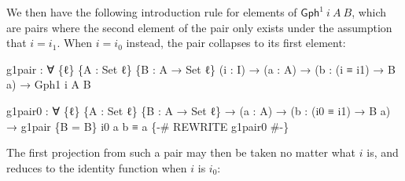 \documentclass[
  12pt]{article}
\newenvironment{Shaded}{\begin{snugshade}}{\end{snugshade}}
\newcommand{\DataTypeTok}[1]{\textcolor[rgb]{0.00,0.34,0.68}{#1}}
\newcommand{\NormalTok}[1]{\textcolor[rgb]{0.12,0.11,0.11}{#1}}
\newcommand{\OtherTok}[1]{\textcolor[rgb]{0.00,0.43,0.16}{#1}}
\newcommand{\PreprocessorTok}[1]{\textcolor[rgb]{0.00,0.43,0.16}{#1}}
\begin{document}
We then have the following introduction rule for elements of
\(\mathsf{Gph}^1 ~ i ~ A ~ B\), which are pairs where the second element
of the pair only exists under the assumption that \(i = i_1\). When
\(i = i_0\) instead, the pair collapses to its first element:

\begin{Shaded}
\begin{Highlighting}[]
\NormalTok{    g1pair }\OtherTok{:} \OtherTok{∀} \OtherTok{\{}\NormalTok{ℓ}\OtherTok{\}} \OtherTok{\{}\NormalTok{A }\OtherTok{:} \DataTypeTok{Set}\NormalTok{ ℓ}\OtherTok{\}} \OtherTok{\{}\NormalTok{B }\OtherTok{:}\NormalTok{ A }\OtherTok{→} \DataTypeTok{Set}\NormalTok{ ℓ}\OtherTok{\}} \OtherTok{(}\NormalTok{i }\OtherTok{:}\NormalTok{ I}\OtherTok{)}
             \OtherTok{→} \OtherTok{(}\NormalTok{a }\OtherTok{:}\NormalTok{ A}\OtherTok{)} \OtherTok{→} \OtherTok{(}\NormalTok{b }\OtherTok{:} \OtherTok{(}\NormalTok{i ≡ i1}\OtherTok{)} \OtherTok{→}\NormalTok{ B a}\OtherTok{)} \OtherTok{→}\NormalTok{ Gph1 i A B}

\NormalTok{    g1pair0 }\OtherTok{:} \OtherTok{∀} \OtherTok{\{}\NormalTok{ℓ}\OtherTok{\}} \OtherTok{\{}\NormalTok{A }\OtherTok{:} \DataTypeTok{Set}\NormalTok{ ℓ}\OtherTok{\}} \OtherTok{\{}\NormalTok{B }\OtherTok{:}\NormalTok{ A }\OtherTok{→} \DataTypeTok{Set}\NormalTok{ ℓ}\OtherTok{\}}
              \OtherTok{→} \OtherTok{(}\NormalTok{a }\OtherTok{:}\NormalTok{ A}\OtherTok{)} \OtherTok{→} \OtherTok{(}\NormalTok{b }\OtherTok{:} \OtherTok{(}\NormalTok{i0 ≡ i1}\OtherTok{)} \OtherTok{→}\NormalTok{ B a}\OtherTok{)}
              \OtherTok{→}\NormalTok{ g1pair }\OtherTok{\{}\NormalTok{B }\OtherTok{=}\NormalTok{ B}\OtherTok{\}}\NormalTok{ i0 a b ≡ a}
    \PreprocessorTok{\{{-}\# REWRITE g1pair0 \#{-}\}}
\end{Highlighting}
\end{Shaded}

The first projection from such a pair may then be taken no matter what
\(i\) is, and reduces to the identity function when \(i\) is \(i_0\):
\end{document}
